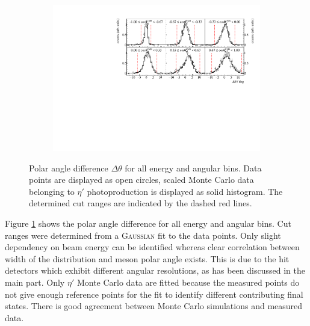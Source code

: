 \begin{figure}[H]
	\ContinuedFloat
	\begin{subfigure}{\linewidth}
		\includegraphics[width=\linewidth]{../figs/hydrogen/bin_cuts/thetacut_ebin3.pdf}
	\end{subfigure}
\caption{Polar angle difference $\Delta\theta$ for all energy and angular bins. Data points are displayed as open circles, scaled Monte Carlo data belonging to $\eta'$ photoproduction is displayed as solid histogram. The determined cut ranges are indicated by the dashed red lines.}
\label{fig:apptheta}	
\end{figure}
Figure \ref{fig:apptheta} shows the polar angle difference for all energy and angular bins. Cut ranges were determined from a \textsc{Gaussian} fit to the data points. Only slight dependency on beam energy can be identified whereas clear correlation between width of the distribution and meson polar angle exists. This is due to the hit detectors which exhibit different angular resolutions, as has been discussed in the main part. Only $\eta'$ Monte Carlo data are fitted because the measured points do not give enough reference points for the fit to identify different contributing final states. There is good agreement between Monte Carlo simulations and measured data.
\newpage
